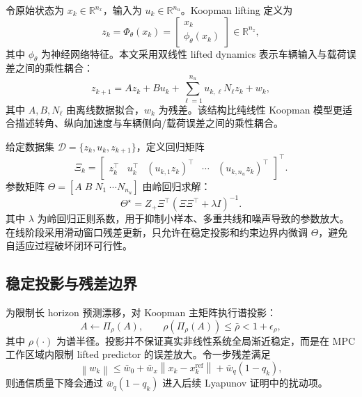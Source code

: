\documentclass[twocolumn,3p,times,procedia]{elsarticle}
\newcommand{\R}{\mathbb{R}}
\newcommand{\norm}[1]{\left\lVert #1 \right\rVert}
\begin{document}
令原始状态为 $x_k\in\R^{n_x}$，输入为 $u_k\in\R^{n_u}$。Koopman lifting 定义为
\begin{equation}
z_k=\Phi_\theta(x_k)=\begin{bmatrix}x_k\\ \phi_\theta(x_k)\end{bmatrix}\in\R^{n_z},
\label{eq:koopman_lift}
\end{equation}
其中 $\phi_\theta$ 为神经网络特征。本文采用双线性 lifted dynamics 表示车辆输入与载荷误差之间的乘性耦合：
\begin{equation}
z_{k+1}=A z_k+B u_k+\sum_{\ell=1}^{n_u} u_{k,\ell} N_\ell z_k+w_k,
\label{eq:bilinear_koopman}
\end{equation}
其中 $A,B,N_\ell$ 由离线数据拟合，$w_k$ 为残差。该结构比纯线性 Koopman 模型更适合描述转角、纵向加速度与车辆侧向/载荷误差之间的乘性耦合。

给定数据集 $\mathcal D=\{z_k,u_k,z_{k+1}\}$，定义回归矩阵
\begin{equation}
\Xi_k=\begin{bmatrix}z_k^\top&u_k^\top&(u_{k,1}z_k)^\top&\cdots&(u_{k,n_u}z_k)^\top\end{bmatrix}^\top .
\label{eq:bilinear_regressor}
\end{equation}
参数矩阵 $\Theta=[A\;B\;N_1\;\cdots N_{n_u}]$ 由岭回归求解：
\begin{equation}
\Theta^\star=Z_+\Xi^\top(\Xi\Xi^\top+\lambda I)^{-1}.
\label{eq:ridge_fit}
\end{equation}
其中 $\lambda$ 为岭回归正则系数，用于抑制小样本、多重共线和噪声导致的参数放大。在线阶段采用滑动窗口残差更新，只允许在稳定投影和约束边界内微调 $\Theta$，避免自适应过程破坏闭环可行性。

\subsection{稳定投影与残差边界}

为限制长 horizon 预测漂移，对 Koopman 主矩阵执行谱投影：
\begin{equation}
A\leftarrow \Pi_\rho(A),\qquad
\rho(\Pi_\rho(A))\le \bar\rho<1+\epsilon_\rho ,
\label{eq:spectral_projection}
\end{equation}
其中 $\rho(\cdot)$ 为谱半径。投影并不保证真实非线性系统全局渐近稳定，而是在 MPC 工作区域内限制 lifted predictor 的误差放大。令一步残差满足
\begin{equation}
\norm{w_k}\le \bar w_0+\bar w_x\norm{x_k-x_k^\mathrm{ref}}+\bar w_q(1-q_k),
\label{eq:residual_bound}
\end{equation}
则通信质量下降会通过 $\bar w_q(1-q_k)$ 进入后续 Lyapunov 证明中的扰动项。
\end{document}
